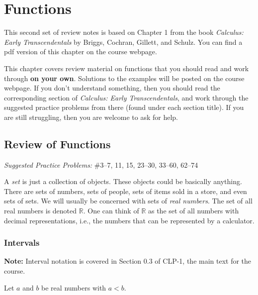 \documentclass[letterpaper,12pt,oneside]{book}
\theoremstyle{definition}
\newcommand{\practicesection}[2]{%
    \section{#1}
    \textit{Suggested Practice Problems:} #2
    \smallskip%
}
\begin{document}
\newpage

{
\renewcommand{\cleardoublepage}{}
\renewcommand{\clearpage}{}
\chapter{Functions}

This second set of review notes is based on Chapter 1 from the book \emph{Calculus: Early Transcendentals} by Briggs, Cochran, Gillett, and Schulz.  You can find a pdf version of this chapter on the course webpage.

This chapter covers review material on functions that you should read and work through \textbf{on your own}.  Solutions to the examples will be posted on the course webpage.  If you don't understand something, then you should read the corresponding section of \emph{Calculus: Early Transcendentals}, and work through the suggested practice problems from there (found under each section title).  If you are still struggling, then you are welcome to ask for help.

\practicesection{Review of Functions}{\#3--7, 11, 15, 23--30, 33--60, 62--74}

\thispagestyle{chapter}

\noindent
A \emph{set} is just a collection of objects.  These objects could be basically anything.  There are sets of numbers, sets of people, sets of items sold in a store, and even sets of sets.  We will usually be concerned with sets of \emph{real numbers}.  The set of all real numbers is denoted $\mathbb{R}$.  One can think of $\mathbb{R}$ as the set of all numbers with decimal representations, i.e., the numbers that can be represented by a calculator.

\subsection*{Intervals}

\textbf{Note:} Interval notation is covered in Section 0.3 of CLP-1, the main text for the course.

\smallskip

\noindent
Let $a$ and $b$ be real numbers with $a<b$.

\begin{center}
\end{center}

}
\end{document}
